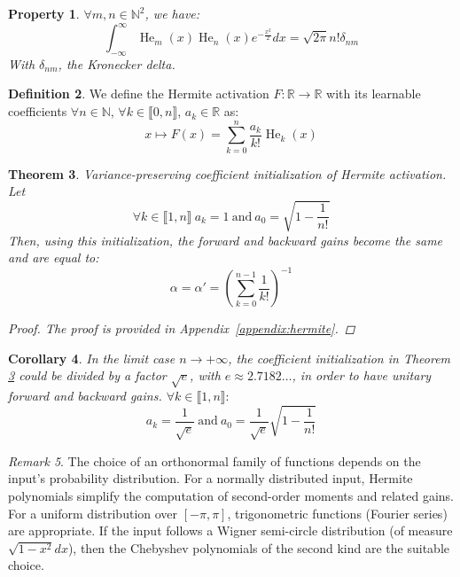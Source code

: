 \documentclass{article} %
\theoremstyle{plain}
\newtheorem{theorem}{Theorem}[section]
\newtheorem{property}[theorem]{Property}
\newtheorem{corollary}[theorem]{Corollary}
\theoremstyle{definition}
\newtheorem{definition}[theorem]{Definition}
\theoremstyle{remark}
\newtheorem{remark}[theorem]{Remark}
\begin{document}
\begin{property}
$\forall m,n \in \mathbb{N}^2$, we have:
\begin{equation}
    \int_{-\infty}^{\infty} \operatorname{He}_m(x) \operatorname{He}_n(x) e^{-\frac{x^2}{2}} d x=\sqrt{2 \pi} n!\delta_{n m}
\end{equation}
With $\delta_{nm}$, the Kronecker delta.
\label{property:orthonormal_main}
\end{property}
\begin{definition}
\label{def:hermite_main}
We define the Hermite activation $F \colon \mathbb{R}\to\mathbb{R}$ with its learnable coefficients $\forall n \in \mathbb{N}$, $\forall k \in \llbracket 0, n \rrbracket$, $a_k \in \mathbb{R}$ as:
\begin{equation}
\label{eq:hermite}
     x \mapsto F(x)=\sum^{n}_{k=0} \frac{a_k}{k!}\operatorname{He}_k(x)
\end{equation}
\end{definition} 

\begin{theorem}
\label{thm:hermite}
Variance-preserving coefficient initialization of Hermite activation. Let 
\begin{equation}
     \forall k \in \llbracket 1,n \rrbracket \ a_k = 1 \ \text{and}\ a_0 = \sqrt{1 - \frac{1}{n!}}
\end{equation}
Then, using this initialization, the forward and backward gains become the same and are equal to:
\begin{equation}
    \alpha = \alpha' = \left(\sum_{k=0}^{n-1} \frac{1}{k!}\right)^{-1}
\end{equation}
\begin{proof}
    The proof is provided in Appendix~\ref{appendix:hermite}.
\end{proof}
\end{theorem}
\begin{corollary}
\label{coro:hermite}
In the limit case $n \to +\infty$, the coefficient initialization in Theorem \ref{thm:hermite} could be divided by a factor $\sqrt{e}$, with $e\approx2.7182 \ldots$, in order to have unitary forward and backward gains. $\forall k \in \llbracket 1,n \rrbracket:$
    \begin{equation}
      a_k = \frac{1}{\sqrt{e}} \ \text{and} \ a_0 = \frac{1}{\sqrt{e}} \sqrt{1 - \frac{1}{n!}}
    \end{equation}
\end{corollary}
\begin{remark}
The choice of an orthonormal family of functions depends on the input's probability distribution. For a normally distributed input, Hermite polynomials simplify the computation of second-order moments and related gains. For a uniform distribution over $[-\pi,\pi]$, trigonometric functions (Fourier series) are appropriate. If the input follows a Wigner semi-circle distribution (of measure $\sqrt{1-x^2}dx$), then the Chebyshev polynomials of the second kind are the suitable choice.
\end{remark}
\end{document}
